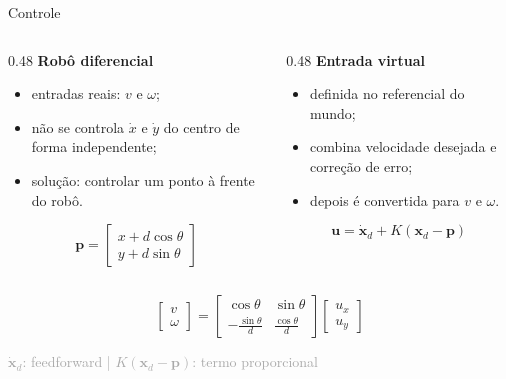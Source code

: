 \documentclass[aspectratio=169]{beamer}
\newcommand{\smalltag}[1]{\textcolor{darkgray}{\scriptsize #1}}
\begin{document}
\begin{frame}{Controle}
    \begin{columns}[T]
        \begin{column}{0.48\textwidth}
            \textbf{Robô diferencial}
            \begin{itemize}
                \item entradas reais: $v$ e $\omega$;
                \item não se controla $\dot{x}$ e $\dot{y}$ do centro de forma independente;
                \item solução: controlar um ponto à frente do robô.
            \end{itemize}

            \[
                \mathbf{p} =
                \begin{bmatrix}
                    x+d\cos\theta\\
                    y+d\sin\theta
                \end{bmatrix}
            \]
        \end{column}
        \begin{column}{0.48\textwidth}
            \textbf{Entrada virtual}
            \begin{itemize}
                \item definida no referencial do mundo;
                \item combina velocidade desejada e correção de erro;
                \item depois é convertida para $v$ e $\omega$.
            \end{itemize}

            \[
                \mathbf{u} =
                \dot{\mathbf{x}}_d +
                K(\mathbf{x}_d-\mathbf{p})
            \]
        \end{column}
    \end{columns}

    \vspace{0.15cm}
    \[
        \begin{bmatrix}
            v\\
            \omega
        \end{bmatrix}
        =
        \begin{bmatrix}
            \cos\theta & \sin\theta\\
            -\frac{\sin\theta}{d} & \frac{\cos\theta}{d}
        \end{bmatrix}
        \begin{bmatrix}
            u_x\\
            u_y
        \end{bmatrix}
    \]

    \smalltag{$\dot{\mathbf{x}}_d$: feedforward \quad | \quad $K(\mathbf{x}_d-\mathbf{p})$: termo proporcional}
\end{frame}
\end{document}
